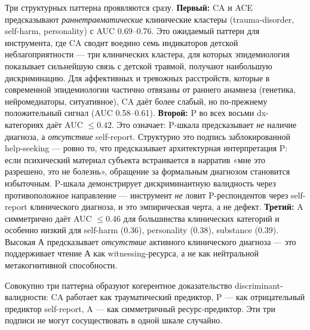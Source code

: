 Три структурных паттерна проявляются сразу. \textbf{Первый:} CA и ACE предсказывают \emph{раннетравматические} клинические кластеры (trauma-disorder, self-harm, personality) с AUC 0.69--0.76. Это ожидаемый паттерн для инструмента, где CA сводит воедино семь индикаторов детской неблагоприятности --- три клинических кластера, для которых эпидемиология показывает сильнейшую связь с детской травмой, получают наибольшую дискриминацию. Для аффективных и тревожных расстройств, которые в современной эпидемиологии частично отвязаны от раннего анамнеза (генетика, нейромедиаторы, ситуативное), CA даёт более слабый, но по-прежнему положительный сигнал (AUC 0.58--0.61). \textbf{Второй:} P во всех восьми dx-категориях даёт AUC $\leq 0.42$. Это означает: P-шкала предсказывает \emph{не} наличие диагноза, а \emph{отсутствие} self-report. Структурно это подпись заблокированной help-seeking --- ровно то, что предсказывает архитектурная интерпретация P: если психический материал субъекта встраивается в нарратив «мне это разрешено, это не болезнь», обращение за формальным диагнозом становится избыточным. P-шкала демонстрирует дискриминантную валидность через противоположное направление --- инструмент \emph{не} ловит P-респондентов через self-report клинического диагноза, и это эмпирическая черта, а не дефект. \textbf{Третий:} A симметрично даёт AUC $\leq 0.46$ для большинства клинических категорий и особенно низкий для self-harm ($0.36$), personality ($0.38$), substance ($0.39$). Высокая А предсказывает \emph{отсутствие} активного клинического диагноза --- это поддерживает чтение А как witnessing-ресурса, а не как нейтральной метакогнитивной способности.

Совокупно три паттерна образуют когерентное доказательство discriminant-валидности: CA работает как трауматический предиктор, P --- как отрицательный предиктор self-report, A --- как симметричный ресурс-предиктор. Эти три подписи не могут сосуществовать в одной шкале случайно.

